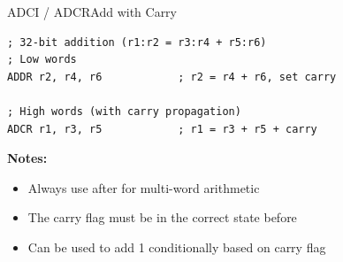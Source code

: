 \begin{instructionbox}{ADCI / ADCR}{Add with Carry}
	\begin{example}
		\begin{lstlisting}
; 32-bit addition (r1:r2 = r3:r4 + r5:r6)
; Low words
ADDR r2, r4, r6            ; r2 = r4 + r6, set carry

; High words (with carry propagation)
ADCR r1, r3, r5            ; r1 = r3 + r5 + carry
		\end{lstlisting}
		\caption{32-bit Addition with Carry Propagation}
	\end{example}

	\textbf{Notes:}
	\begin{itemize}
		\item Always use after  for multi-word arithmetic
		\item The carry flag must be in the correct state before 
		\item Can be used to add 1 conditionally based on carry flag
	\end{itemize}
\end{instructionbox}

